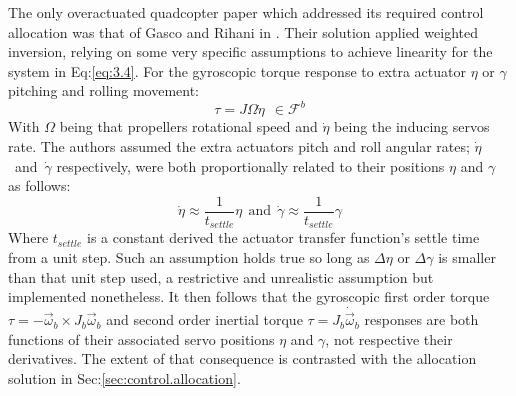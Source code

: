\par
The only overactuated quadcopter paper which addressed its required control allocation was that of Gasco and Rihani in \cite{tiltgasco,tiltrihani}. Their solution applied weighted inversion, relying on some very specific assumptions to achieve linearity for the system in Eq:\ref{eq:3.4}. For the gyroscopic torque response to extra actuator $\eta$ or $\gamma$ pitching and rolling movement:
\begin{equation}
\tau=J\Omega\dot{\eta}~~\in\mathcal{F}^b
\end{equation}
With $\Omega$ being that propellers rotational speed and $\dot{\eta}$ being the inducing servos rate. The authors assumed the extra actuators pitch and roll angular rates; $\dot{\eta}$~and~$\dot{\gamma}$ respectively, were both proportionally related to their positions $\eta$ and $\gamma$ as follows:
\begin{equation}
\dot{\eta}\approx \frac{1}{t_{settle}}\eta~~\text{and}~~\dot{\gamma}\approx \frac{1}{t_{settle}}\gamma
\end{equation}
Where $t_{settle}$ is a constant derived the actuator transfer function's settle time from a unit step. Such an assumption holds true so long as $\Delta\eta$ or $\Delta\gamma$ is smaller than that unit step used, a restrictive and unrealistic assumption but implemented nonetheless. It then follows that the gyroscopic first order torque $\tau=-\vec{\omega}_b\times J_b\vec{\omega}_b$ and second order inertial torque $\tau=J_b\dot{\vec{\omega}}_b$ responses are both functions of their associated servo positions $\eta$ and $\gamma$, not respective their derivatives. The extent of that consequence is contrasted with the allocation solution in Sec:\ref{sec:control.allocation}.
